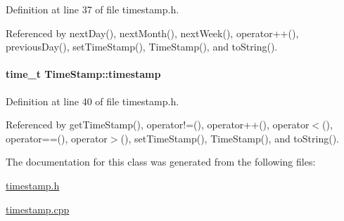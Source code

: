 Definition at line 37 of file timestamp.h.

Referenced by next\-Day(), next\-Month(), next\-Week(), operator++(), previous\-Day(), set\-Time\-Stamp(), Time\-Stamp(), and to\-String().\hypertarget{classTimeStamp_TimeStampo1}{
\paragraph[timestamp]{\setlength{\rightskip}{0pt plus 5cm}time\_\-t Time\-Stamp::timestamp}\hfill}
\label{classTimeStamp_TimeStampo1}




Definition at line 40 of file timestamp.h.

Referenced by get\-Time\-Stamp(), operator!=(), operator++(), operator$<$(), operator==(), operator$>$(), set\-Time\-Stamp(), Time\-Stamp(), and to\-String().

The documentation for this class was generated from the following files:\begin{CompactItemize}
\item 
\hyperlink{timestamp_8h}{timestamp.h}\item 
\hyperlink{timestamp_8cpp}{timestamp.cpp}\end{CompactItemize}
